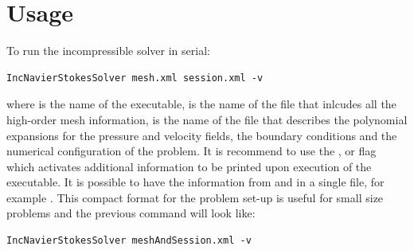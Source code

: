 \section{Usage}

To run the incompressible solver in serial:
\begin{lstlisting}[style=BashInputStyle]
IncNavierStokesSolver mesh.xml session.xml -v 
\end{lstlisting}
%
where  is the name of the executable,  is the name of the file that inlcudes all the high-order mesh information,  is the name of the file that describes the polynomial expansions for the pressure and velocity fields, the boundary conditions and the numerical configuration of the problem. It is recommend to use the , or  flag which activates additional information to be printed upon execution of the executable. It is possible to have the information from  and  in a single file, for example . This compact format for the problem set-up is useful for small size problems and the previous command will look like:
\begin{lstlisting}[style=BashInputStyle]
IncNavierStokesSolver meshAndSession.xml -v 
\end{lstlisting}


